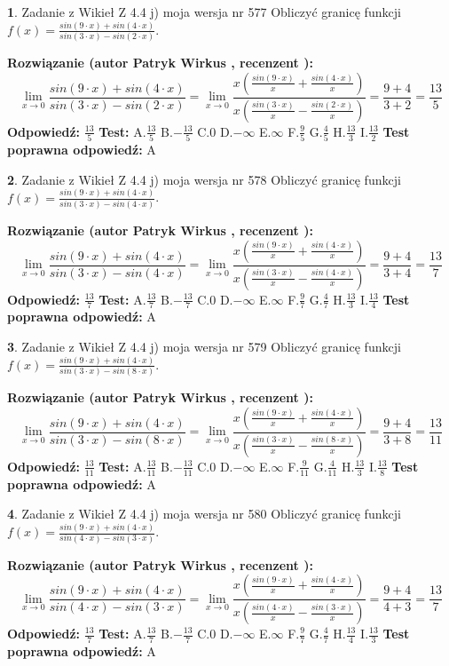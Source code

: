 \documentclass[12pt, a4paper]{article}
\theoremstyle{definition} %
\newtheorem{zad}{}
\newcommand{\zadStart}[1]{\begin{zad}#1\newline}
\newcommand{\zadStop}{\end{zad}}
\newcommand{\rozwStart}[2]{\noindent \textbf{Rozwiązanie (autor #1 , recenzent #2): }\newline}
\newcommand{\rozwStop}{\newline}
\newcommand{\odpStart}{\noindent \textbf{Odpowiedź:}\newline}
\newcommand{\odpStop}{\newline}
\newcommand{\testStart}{\noindent \textbf{Test:}\newline}
\newcommand{\testStop}{\newline}
\newcommand{\kluczStart}{\noindent \textbf{Test poprawna odpowiedź:}\newline}
\newcommand{\kluczStop}{\newline}
\begin{document}
\zadStart{Zadanie z Wikieł Z 4.4 j) moja wersja nr 577}
Obliczyć granicę funkcji $f(x)=\frac{sin(9\cdot x) +sin(4\cdot x)}{sin(3\cdot x) -sin(2\cdot x)}$.
\zadStop
\rozwStart{Patryk Wirkus}{}
$$\lim\limits_{x\to 0}\frac{sin(9\cdot x) +sin(4\cdot x)}{sin(3\cdot x) -sin(2\cdot x)}=\lim\limits_{x\to 0}\frac{x(\frac{sin(9\cdot x)}{x}+\frac{sin(4\cdot x)}{x})}{x(\frac{sin(3\cdot x)}{x}-\frac{sin(2\cdot x)}{x})}=\frac{9+4}{3+2} = \frac{13}{5}$$
\rozwStop
\odpStart
$\frac{13}{5}$
\odpStop
\testStart
A.$\frac{13}{5}$
B.$-\frac{13}{5}$
C.$0$
D.$-\infty$
E.$\infty$
F.$\frac{9}{5}$
G.$\frac{4}{5}$
H.$\frac{13}{3}$
I.$\frac{13}{2}$
\testStop
\kluczStart
A
\kluczStop



\zadStart{Zadanie z Wikieł Z 4.4 j) moja wersja nr 578}
Obliczyć granicę funkcji $f(x)=\frac{sin(9\cdot x) +sin(4\cdot x)}{sin(3\cdot x) -sin(4\cdot x)}$.
\zadStop
\rozwStart{Patryk Wirkus}{}
$$\lim\limits_{x\to 0}\frac{sin(9\cdot x) +sin(4\cdot x)}{sin(3\cdot x) -sin(4\cdot x)}=\lim\limits_{x\to 0}\frac{x(\frac{sin(9\cdot x)}{x}+\frac{sin(4\cdot x)}{x})}{x(\frac{sin(3\cdot x)}{x}-\frac{sin(4\cdot x)}{x})}=\frac{9+4}{3+4} = \frac{13}{7}$$
\rozwStop
\odpStart
$\frac{13}{7}$
\odpStop
\testStart
A.$\frac{13}{7}$
B.$-\frac{13}{7}$
C.$0$
D.$-\infty$
E.$\infty$
F.$\frac{9}{7}$
G.$\frac{4}{7}$
H.$\frac{13}{3}$
I.$\frac{13}{4}$
\testStop
\kluczStart
A
\kluczStop



\zadStart{Zadanie z Wikieł Z 4.4 j) moja wersja nr 579}
Obliczyć granicę funkcji $f(x)=\frac{sin(9\cdot x) +sin(4\cdot x)}{sin(3\cdot x) -sin(8\cdot x)}$.
\zadStop
\rozwStart{Patryk Wirkus}{}
$$\lim\limits_{x\to 0}\frac{sin(9\cdot x) +sin(4\cdot x)}{sin(3\cdot x) -sin(8\cdot x)}=\lim\limits_{x\to 0}\frac{x(\frac{sin(9\cdot x)}{x}+\frac{sin(4\cdot x)}{x})}{x(\frac{sin(3\cdot x)}{x}-\frac{sin(8\cdot x)}{x})}=\frac{9+4}{3+8} = \frac{13}{11}$$
\rozwStop
\odpStart
$\frac{13}{11}$
\odpStop
\testStart
A.$\frac{13}{11}$
B.$-\frac{13}{11}$
C.$0$
D.$-\infty$
E.$\infty$
F.$\frac{9}{11}$
G.$\frac{4}{11}$
H.$\frac{13}{3}$
I.$\frac{13}{8}$
\testStop
\kluczStart
A
\kluczStop



\zadStart{Zadanie z Wikieł Z 4.4 j) moja wersja nr 580}
Obliczyć granicę funkcji $f(x)=\frac{sin(9\cdot x) +sin(4\cdot x)}{sin(4\cdot x) -sin(3\cdot x)}$.
\zadStop
\rozwStart{Patryk Wirkus}{}
$$\lim\limits_{x\to 0}\frac{sin(9\cdot x) +sin(4\cdot x)}{sin(4\cdot x) -sin(3\cdot x)}=\lim\limits_{x\to 0}\frac{x(\frac{sin(9\cdot x)}{x}+\frac{sin(4\cdot x)}{x})}{x(\frac{sin(4\cdot x)}{x}-\frac{sin(3\cdot x)}{x})}=\frac{9+4}{4+3} = \frac{13}{7}$$
\rozwStop
\odpStart
$\frac{13}{7}$
\odpStop
\testStart
A.$\frac{13}{7}$
B.$-\frac{13}{7}$
C.$0$
D.$-\infty$
E.$\infty$
F.$\frac{9}{7}$
G.$\frac{4}{7}$
H.$\frac{13}{4}$
I.$\frac{13}{3}$
\testStop
\kluczStart
A
\kluczStop
\end{document}
